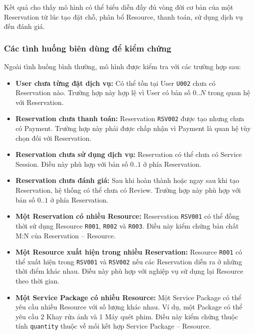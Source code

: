 Kết quả cho thấy mô hình có thể biểu diễn đầy đủ vòng đời cơ bản của một Reservation từ lúc tạo đặt chỗ, phân bổ Resource, thanh toán, sử dụng dịch vụ đến đánh giá.

\subsubsection{Các tình huống biên dùng để kiểm chứng}

Ngoài tình huống bình thường, mô hình được kiểm tra với các trường hợp sau:

\begin{itemize}

\item \textbf{User chưa từng đặt dịch vụ:} Có thể tồn tại User \texttt{U002} chưa có Reservation nào. Trường hợp này hợp lệ vì User có bản số $0..N$ trong quan hệ với Reservation.

\item \textbf{Reservation chưa thanh toán:} Reservation \texttt{RSV002} được tạo nhưng chưa có Payment. Trường hợp này phải được chấp nhận vì Payment là quan hệ tùy chọn đối với Reservation.

\item \textbf{Reservation chưa sử dụng dịch vụ:} Reservation có thể chưa có Service Session. Điều này phù hợp với bản số $0..1$ ở phía Reservation.

\item \textbf{Reservation chưa đánh giá:} Sau khi hoàn thành hoặc ngay sau khi tạo Reservation, hệ thống có thể chưa có Review. Trường hợp này phù hợp với bản số $0..1$ ở phía Reservation.

\item \textbf{Một Reservation có nhiều Resource:} Reservation \texttt{RSV001} có thể đồng thời sử dụng Resource \texttt{R001}, \texttt{R002} và \texttt{R003}. Điều này kiểm chứng bản chất M:N của Reservation -- Resource.

\item \textbf{Một Resource xuất hiện trong nhiều Reservation:} Resource \texttt{R001} có thể xuất hiện trong \texttt{RSV001} và \texttt{RSV002} nếu các Reservation diễn ra ở những thời điểm khác nhau. Điều này phù hợp với nghiệp vụ sử dụng lại Resource theo thời gian.

\item \textbf{Một Service Package có nhiều Resource:} Một Service Package có thể yêu cầu nhiều Resource với số lượng khác nhau. Ví dụ, một Package có thể yêu cầu 2 Khay rửa ảnh và 1 Máy quét phim. Điều này kiểm chứng thuộc tính \texttt{quantity} thuộc về mối kết hợp Service Package -- Resource.


\end{itemize}
